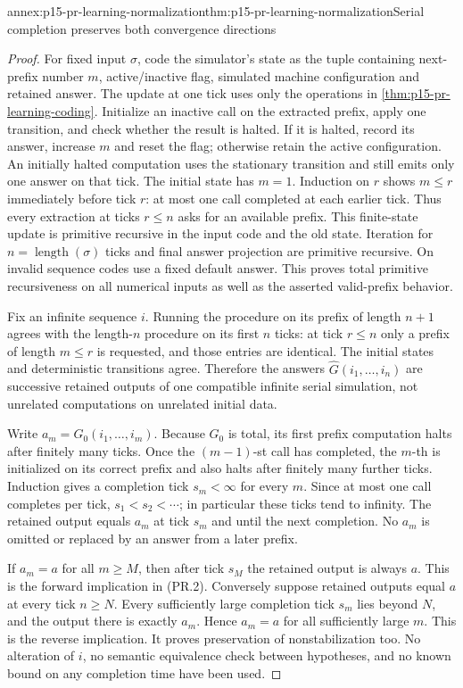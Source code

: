\begin{annexitem}{annex:p15-pr-learning-normalization}{thm:p15-pr-learning-normalization}{Serial completion preserves both convergence directions}
\begin{proof}
For fixed input \(\sigma\), code the simulator's state as
the tuple containing next-prefix number \(m\), active/inactive
flag, simulated machine configuration and retained answer.
The update at one tick uses only the operations in
\cref{thm:p15-pr-learning-coding}. Initialize an inactive call
on the extracted prefix, apply one transition, and check
whether the result is halted. If it is halted, record its
answer, increase \(m\) and reset the flag; otherwise retain
the active configuration. An initially halted computation
uses the stationary transition and still emits only one
answer on that tick. The initial state has \(m=1\).
Induction on \(r\) shows \(m\leq r\) immediately before
tick \(r\): at most one call completed at each earlier
tick. Thus every extraction at ticks \(r\leq n\)
asks for an available prefix.
This finite-state update is primitive recursive in
the input code and the old state. Iteration for
\(n=\operatorname{length}(\sigma)\) ticks and final
answer projection are primitive recursive.
On invalid sequence codes use a fixed default answer.
This proves total primitive recursiveness on all numerical
inputs as well as the asserted valid-prefix behavior.

Fix an infinite sequence \(i\). Running the procedure
on its prefix of length \(n+1\) agrees with the length-\(n\)
procedure on its first \(n\) ticks: at tick \(r\leq n\)
only a prefix of length \(m\leq r\) is requested, and
those entries are identical. The initial states and
deterministic transitions agree. Therefore the answers
\(\widehat G(i_1,\ldots,i_n)\) are successive retained
outputs of one compatible infinite serial simulation,
not unrelated computations on unrelated initial data.

Write \(a_m=G_0(i_1,\ldots,i_m)\).
Because \(G_0\) is total, its first prefix computation
halts after finitely many ticks. Once the \((m-1)\)-st
call has completed, the \(m\)-th is initialized on
its correct prefix and also halts after finitely many
further ticks. Induction gives a completion tick
\(s_m<\infty\) for every \(m\).
Since at most one call completes per tick,
\(s_1<s_2<\cdots\); in particular these ticks tend
to infinity. The retained output equals \(a_m\)
at tick \(s_m\) and until the next completion.
No \(a_m\) is omitted or replaced by an answer from
a later prefix.

If \(a_m=a\) for all \(m\geq M\), then after tick
\(s_M\) the retained output is always \(a\).
This is the forward implication in (PR.2).
Conversely suppose retained outputs equal \(a\)
at every tick \(n\geq N\).
Every sufficiently large completion tick \(s_m\)
lies beyond \(N\), and the output there is exactly
\(a_m\). Hence \(a_m=a\) for all sufficiently large
\(m\). This is the reverse implication.
It proves preservation of nonstabilization too.
No alteration of \(i\), no semantic equivalence check
between hypotheses, and no known bound on any
completion time have been used.
\end{proof}
\end{annexitem}

